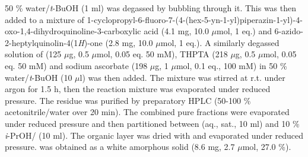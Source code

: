 {{{{{{{{{{{{{{{{{{{{50 \% water/\textit{t}-BuOH (1 ml) was degassed by bubbling  through it. This was then added to a mixture of 1-cyclopropyl-6-fluoro-7-(4-(hex-5-yn-1-yl)piperazin-1-yl)-4-oxo-1,4\hyp{}dihydro\-quinoline-3-carboxylic acid  (4.1 mg, 10.0 $\mu$mol, 1 eq.) and 6-azido-2-heptylquinolin-4(1\textit{H})-one  (2.8 mg, 10.0 $\mu$mol, 1 eq.).
A similarly degassed solution of  (125 $\mu$g, 0.5 $\mu$mol, 0.05 eq. 50 mM), THPTA (218 $\mu$g, 0.5 $\mu$mol, 0.05 eq. 50 mM) and sodium ascorbate (198 $\mu$g, 1 $\mu$mol, 0.1 eq., 100 mM) in 50 \% water/\textit{t}-BuOH (10 $\mu$l) was then added. 
The mixture was stirred at r.t. under argon for 1.5 h, then the reaction mixture was evaporated under reduced pressure. The residue was purified by preparatory HPLC (50-100 \% acetonitrile/water over 20 min).
The combined pure fractions were evaporated under reduced pressure and then partitioned between  (aq., sat., 10 ml) and 10 \% \textit{i}-PrOH/ (10 ml). The organic layer was dried with  and evaporated under reduced pressure.
 was obtained as a white amorphous solid (8.6 mg, 2.7 $\mu$mol, 27.0 \%). %
\\[1\baselineskip]
}}}}}}}}}}}}}}}}}}}}
